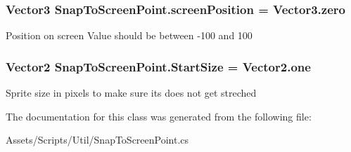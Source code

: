\subsubsection[{\texorpdfstring{screen\+Position}{screenPosition}}]{\setlength{\rightskip}{0pt plus 5cm}Vector3 Snap\+To\+Screen\+Point.\+screen\+Position = Vector3.\+zero}\hypertarget{class_snap_to_screen_point_af16a0e4b3b605f83f8382f759b7e2ef4}{}\label{class_snap_to_screen_point_af16a0e4b3b605f83f8382f759b7e2ef4}


Position on screen Value should be between -\/100 and 100 

\subsubsection[{\texorpdfstring{Start\+Size}{StartSize}}]{\setlength{\rightskip}{0pt plus 5cm}Vector2 Snap\+To\+Screen\+Point.\+Start\+Size = Vector2.\+one}\hypertarget{class_snap_to_screen_point_a1c894fdec5879ad749eb2a0fb86c4637}{}\label{class_snap_to_screen_point_a1c894fdec5879ad749eb2a0fb86c4637}


Sprite size in pixels to make sure it\textquotesingle{}s does not get streched 



The documentation for this class was generated from the following file\+:\begin{DoxyCompactItemize}
\item 
Assets/\+Scripts/\+Util/Snap\+To\+Screen\+Point.\+cs\end{DoxyCompactItemize}
